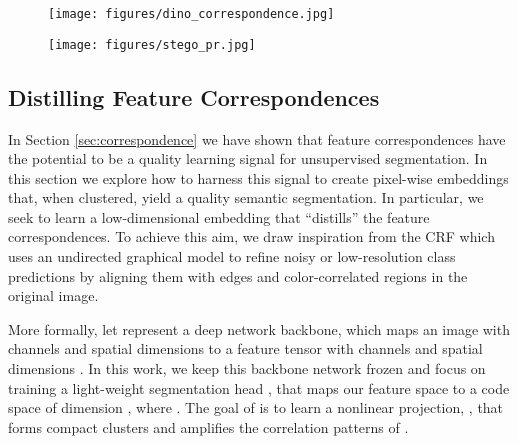 \documentclass{article} \usepackage{iclr2022_conference,times}
\begin{document}
\begin{figure}[t]
\centering
\begin{minipage}{.60\textwidth}
  \centering
    \texttt{[image: figures/dino\_correspondence.jpg]}
    \vspace{-.2in}
  \label{fig:correspondence}
\end{minipage}\hfill
\begin{minipage}{.38\textwidth}
  \centering
  \texttt{[image: figures/stego\_pr.jpg]}
  \vspace{-.1in}
  \label{fig:pr}
\end{minipage}
\end{figure} 

\subsection{Distilling Feature Correspondences}
\label{sec:distillation} 

In Section \ref{sec:correspondence} we have shown that feature correspondences have the potential to be a quality learning signal for unsupervised segmentation. In this section we explore how to harness this signal to create pixel-wise embeddings that, when clustered, yield a quality semantic segmentation. In particular, we seek to learn a low-dimensional embedding that ``distills'' the feature correspondences. To achieve this aim, we draw inspiration from the CRF which uses an undirected graphical model to refine noisy or low-resolution class predictions by aligning them with edges and color-correlated regions in the original image. 

More formally, let  represent a deep network backbone, which maps an image  with  channels and spatial dimensions  to a feature tensor  with  channels and spatial dimensions . In this work, we keep this backbone network frozen and focus on training a light-weight segmentation head , that maps our feature space to a code space of dimension , where . The goal of  is to learn a nonlinear projection, , that forms compact clusters and amplifies the correlation patterns of .
\end{document}
